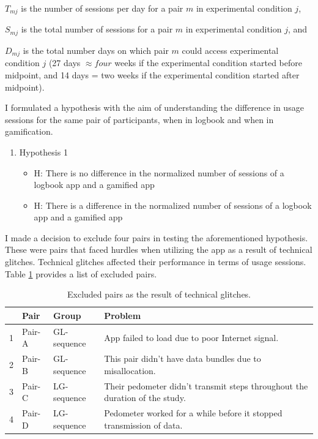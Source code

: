$T_{mj}$ is the number of sessions per day for a pair $m$ in experimental condition $j$,


 $S_{mj}$ is the total number of sessions for a pair $m$ in experimental condition $j$, and

$D_{mj}$ is the total number days on which pair $m$ could access experimental condition $j$ (27 days $\approx four$ weeks if the experimental condition started before midpoint, and 14 days = two weeks if the experimental condition started after midpoint).

I formulated a hypothesis with the aim of understanding the difference in usage sessions for the same pair of participants, when in logbook and when in gamification.

\begin{enumerate}
   \item{Hypothesis 1}
      \begin{itemize}
       \item{H}: There is no difference in the normalized number of sessions of a logbook app and a gamified app
       \item{H}: There is a difference in the normalized number of sessions of a logbook app and a gamified app
      \end{itemize}
   \end{enumerate}
   
I made a decision to exclude four pairs in testing the aforementioned hypothesis. These were pairs that faced hurdles when utilizing the app as a result of technical glitches. Technical glitches affected their performance in terms of usage sessions. Table \ref{table:usageproblems} provides a list of excluded pairs. 

\begin{table}[h!]
  \begin{center}
    \caption{Excluded pairs as the result of technical glitches.}
    \label{table:usageproblems}
	\begin{tabular}{|l|l|l|p{6cm}|}
		\hline
		&Pair&Group&Problem\\
		\hline
		1&Pair-A&GL-sequence &App failed to load due to poor Internet signal.\\
		\hline
		2&Pair-B&GL-sequence&This pair didn't have data bundles due to misallocation. \\
		\hline
		3&Pair-C & LG-sequence& Their pedometer didn't transmit steps throughout the duration of the study.\\
		\hline
		4&Pair-D & LG-sequence& Pedometer worked for a while before it stopped transmission of data.\\
	\hline
	\end{tabular}
  \end{center}
\end{table}

